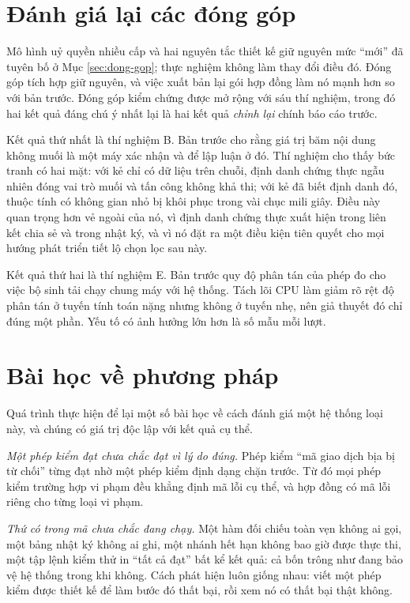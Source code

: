 \section{Đánh giá lại các đóng góp}

Mô hình uỷ quyền nhiều cấp và hai nguyên tắc thiết kế giữ nguyên mức ``mới'' đã tuyên bố ở Mục \ref{sec:dong-gop}; thực nghiệm không làm thay đổi điều đó. Đóng góp tích hợp giữ nguyên, và việc xuất bản lại gói hợp đồng làm nó mạnh hơn so với bản trước. Đóng góp kiểm chứng được mở rộng với sáu thí nghiệm, trong đó hai kết quả đáng chú ý nhất lại là hai kết quả \emph{chỉnh lại} chính báo cáo trước.

Kết quả thứ nhất là thí nghiệm B. Bản trước cho rằng giá trị băm nội dung không muối là một máy xác nhận và để lập luận ở đó. Thí nghiệm cho thấy bức tranh có hai mặt: với kẻ chỉ có dữ liệu trên chuỗi, định danh chứng thực ngẫu nhiên đóng vai trò muối và tấn công không khả thi; với kẻ đã biết định danh đó, thuộc tính có không gian nhỏ bị khôi phục trong vài chục mili giây. Điều này quan trọng hơn vẻ ngoài của nó, vì định danh chứng thực xuất hiện trong liên kết chia sẻ và trong nhật ký, và vì nó đặt ra một điều kiện tiên quyết cho mọi hướng phát triển tiết lộ chọn lọc sau này.

Kết quả thứ hai là thí nghiệm E. Bản trước quy độ phân tán của phép đo cho việc bộ sinh tải chạy chung máy với hệ thống. Tách lõi CPU làm giảm rõ rệt độ phân tán ở tuyến tính toán nặng nhưng không ở tuyến nhẹ, nên giả thuyết đó chỉ đúng một phần. Yếu tố có ảnh hưởng lớn hơn là số mẫu mỗi lượt.

\section{Bài học về phương pháp}

Quá trình thực hiện để lại một số bài học về cách đánh giá một hệ thống loại này, và chúng có giá trị độc lập với kết quả cụ thể.

\textit{Một phép kiểm đạt chưa chắc đạt vì lý do đúng.} Phép kiểm ``mã giao dịch bịa bị từ chối'' từng đạt nhờ một phép kiểm định dạng chặn trước. Từ đó mọi phép kiểm trường hợp vi phạm đều khẳng định mã lỗi cụ thể, và hợp đồng có mã lỗi riêng cho từng loại vi phạm.

\textit{Thứ có trong mã chưa chắc đang chạy.} Một hàm đối chiếu toàn vẹn không ai gọi, một bảng nhật ký không ai ghi, một nhánh hết hạn không bao giờ được thực thi, một tập lệnh kiểm thử in ``tất cả đạt'' bất kể kết quả: cả bốn trông như đang bảo vệ hệ thống trong khi không. Cách phát hiện luôn giống nhau: viết một phép kiểm được thiết kế để làm bước đó thất bại, rồi xem nó có thất bại thật không.

